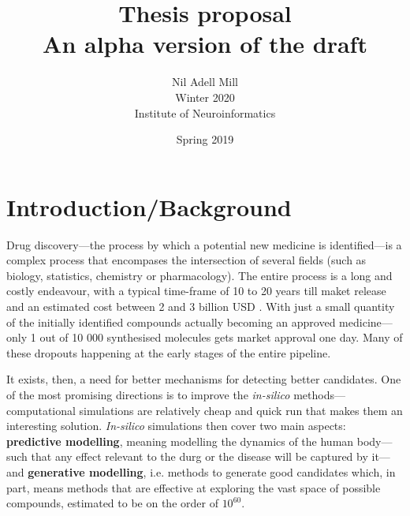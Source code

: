 \documentclass{article}
\begin{document}
\title{\Large Thesis proposal \\ \small An alpha version of the draft}
\author{Nil Adell Mill \\
        Winter 2020 \\
        Institute of Neuroinformatics \\}
\date{Spring 2019}

\maketitle

    \section*{Introduction/Background}  

Drug discovery—the process by which a potential new medicine is identified---is a
 complex process that encompases the intersection of several fields (such as biology,
 statistics, chemistry or pharmacology). The entire process is a long and costly
 endeavour, with a typical time-frame of 10 to 20 years till maket release and an
 estimated cost between 2 and 3 billion USD \cite{Schneider2019, Scannell2012}. With
 just a small quantity of the initially identified compounds actually becoming an
 approved medicine—only 1 out of 10 000 synthesised molecules gets market approval one
 day. Many of these dropouts happening at the early stages of the entire pipeline.

It exists, then, a need for better mechanisms for detecting better candidates. One of
 the most promising directions is to improve the \emph{in-silico}
 methods---computational simulations are relatively cheap and quick run that makes them
 an interesting solution. \emph{In-silico} simulations then cover two main aspects:
 \textbf{predictive modelling}, meaning modelling the dynamics of the human body---such
 that any effect relevant to the durg or the disease will be captured by it---and
 \textbf{generative modelling}, i.e. methods to generate good candidates which, in part,
 means methods that are effective at exploring the vast space of possible compounds,
 estimated to be on the order of $10^{60}$\cite{Reymond2012}.



\end{document}
